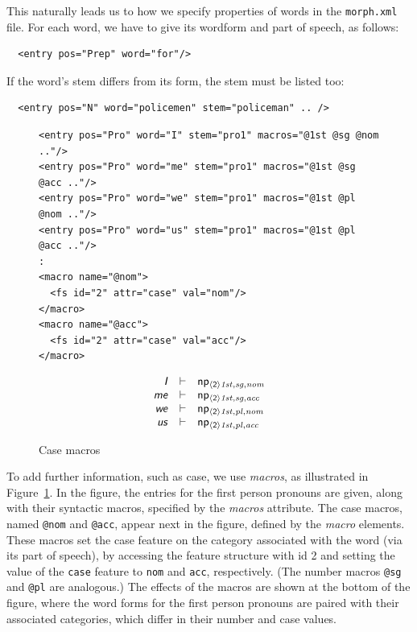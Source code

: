 \documentclass[11pt]{article}
\begin{document}
This naturally leads us to how we specify properties of words in the
\texttt{morph.xml} file. For each word, we have to give its wordform 
and part of speech, as follows:

\begin{verbatim}
  <entry pos="Prep" word="for"/>
\end{verbatim}

\noindent If the word's stem differs from its form, the stem must be
listed too:

\begin{verbatim}
  <entry pos="N" word="policemen" stem="policeman" .. />
\end{verbatim}

\begin{figure}
\begin{small}
\begin{verbatim}
<entry pos="Pro" word="I" stem="pro1" macros="@1st @sg @nom .."/>
<entry pos="Pro" word="me" stem="pro1" macros="@1st @sg @acc .."/>
<entry pos="Pro" word="we" stem="pro1" macros="@1st @pl @nom .."/>
<entry pos="Pro" word="us" stem="pro1" macros="@1st @pl @acc .."/>
:
<macro name="@nom"> 
  <fs id="2" attr="case" val="nom"/>
</macro>
<macro name="@acc">
  <fs id="2" attr="case" val="acc"/>
</macro>
\end{verbatim}
\end{small}
\[
\begin{array}{rcl}
\textsf{\textsl{I}} & \vdash & \mathsf{np_{\langle2\rangle\mathit{1st,sg,nom}}} \\ 
\textsf{\textsl{me}} & \vdash & \mathsf{np_{\langle2\rangle\mathit{1st,sg,acc}}} \\
\textsf{\textsl{we}} & \vdash & \mathsf{np_{\langle2\rangle\mathit{1st,pl,nom}}} \\ 
\textsf{\textsl{us}} & \vdash & \mathsf{np_{\langle2\rangle\mathit{1st,pl,acc}}} \\
\end{array}
\]
\caption{Case macros}
\label{case-macros}
\end{figure}

To add further information, such as case, we use \textsl{macros}, as
illustrated in Figure~\ref{case-macros}. In the figure, the entries for
the first person pronouns are given, along with their syntactic macros,
specified by the \textsl{macros} attribute. The case macros, named
\texttt{@nom} and \texttt{@acc}, appear next in the figure, defined by
the \textsl{macro} elements. These macros set the case feature on the
category associated with the word (via its part of speech), by accessing
the feature structure with id 2 and setting the value of the
\texttt{case} feature to \texttt{nom} and \texttt{acc}, respectively.
(The number macros \texttt{@sg} and \texttt{@pl} are analogous.) 
The effects of the macros are shown at the bottom of the figure, where
the word forms for the first person pronouns are paired with their
associated categories, which differ in their number and case values.
\end{document}
